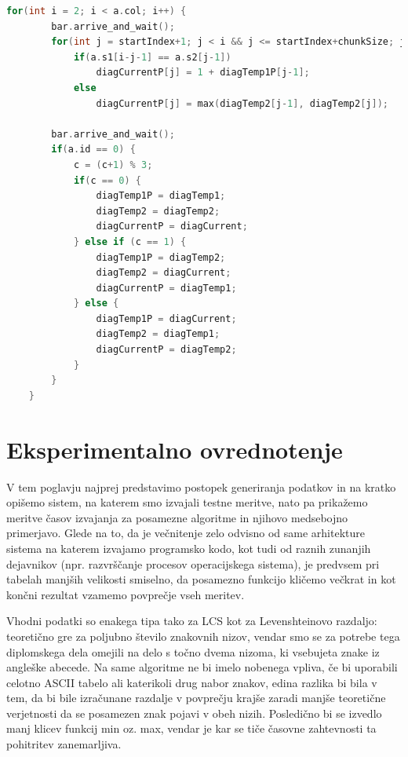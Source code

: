 \documentclass[a4paper,12pt,openright]{book}
\begin{document}
\bigskip
\bigskip
\begin{lstlisting}[language=C++, caption={Del kode za računanje razdalje LCS s prostorsko in pomnilniško optimizacijo.}, captionpos=b, label=LCSspaceMem]
for(int i = 2; i < a.col; i++) {
        bar.arrive_and_wait();
        for(int j = startIndex+1; j < i && j <= startIndex+chunkSize; j++) 
            if(a.s1[i-j-1] == a.s2[j-1])
                diagCurrentP[j] = 1 + diagTemp1P[j-1];
            else
                diagCurrentP[j] = max(diagTemp2[j-1], diagTemp2[j]);

        bar.arrive_and_wait();
        if(a.id == 0) {
            c = (c+1) % 3;
            if(c == 0) {
                diagTemp1P = diagTemp1;
                diagTemp2 = diagTemp2;
                diagCurrentP = diagCurrent;
            } else if (c == 1) {
                diagTemp1P = diagTemp2;
                diagTemp2 = diagCurrent;
                diagCurrentP = diagTemp1;
            } else {
                diagTemp1P = diagCurrent;
                diagTemp2 = diagTemp1;
                diagCurrentP = diagTemp2;
            }
        }
    }
\end{lstlisting}
    


\chapter{Eksperimentalno ovrednotenje}

V tem poglavju najprej predstavimo postopek generiranja podatkov in na kratko opišemo sistem, na katerem smo izvajali testne meritve, nato pa prikažemo meritve časov izvajanja za posamezne algoritme in njihovo medsebojno primerjavo. Glede na to, da je večnitenje zelo odvisno od same arhitekture sistema na katerem izvajamo programsko kodo, kot tudi od raznih zunanjih dejavnikov (npr. razvrščanje procesov operacijskega sistema), je predvsem pri tabelah manjših velikosti smiselno, da posamezno funkcijo kličemo večkrat in kot končni rezultat vzamemo povprečje vseh meritev. 

Vhodni podatki so enakega tipa tako za LCS kot za Levenshteinovo razdaljo: teoretično gre za poljubno število znakovnih nizov, vendar smo se za potrebe tega diplomskega dela omejili na delo s točno dvema nizoma, ki vsebujeta znake iz angleške abecede. Na same algoritme ne bi imelo nobenega vpliva, če bi uporabili celotno ASCII tabelo ali katerikoli drug nabor znakov, edina razlika bi bila v tem, da bi bile izračunane razdalje v povprečju krajše zaradi manjše teoretične verjetnosti da se posamezen znak pojavi v obeh nizih. Posledično bi se izvedlo manj klicev funkcij min oz. max, vendar je kar se tiče časovne zahtevnosti ta pohitritev zanemarljiva. 
\end{document}
